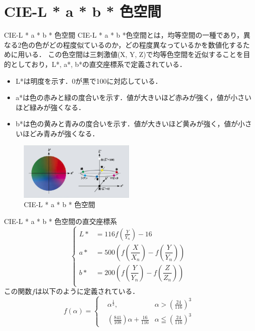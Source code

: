 \documentclass[8pt, jfont=ipaexm, t]{beamer} %
\begin{document}
\section{CIE-L * a * b * 色空間}
\begin{frame}{CIE-L * a * b * 色空間}
CIE-L * a * b *色空間とは，均等空間の一種であり，異なる2色の色がどの程度似ているのか，どの程度異なっているかを数値化するために用いる．
この色空間は三刺激値(X, Y,
Z)で均等色空間を近似することを目的としており，L*, a*, b*の直交座標系で定義されている． 
\begin{itemize}
  \item L*は明度を示す．0が黒で100に対応している． 
  \item a*は色の赤みと緑の度合いを示す．値が大きいほど赤みが強く，値が小さいほど緑みが強くなる．
  \item b*は色の黄みと青みの度合いを示す．値が大きいほど黄みが強く，値が小さいほどみ青みが強くなる．
\end{itemize}
\begin{figure}
  \centering
  \includegraphics[width=0.5\textwidth]{./figure/024.png}
  \caption{CIE-L * a * b * 色空間}
  \label{fig:cie-lab}
\end{figure}
\end{frame}
\begin{frame}{CIE-L * a * b * 色空間の直交座標系}
\begin{equation}
\left\{
\begin{aligned}
    L* &= 116f\left(\frac{Y}{Y_n}\right)-16 \\
    a* &= 500\left(f\left(\dfrac{X}{X_n}\right) - f\left(\dfrac{Y}{Y_n}\right)\right) \\
    b* &= 200\left(f\left(\dfrac{Y}{Y_n}\right) - f\left(\dfrac{Z}{Z_n}\right)\right) \\
\end{aligned}
\right.
\end{equation}
この関数\(f\)は以下のように定義されている．
\begin{equation}
f(\alpha) =
\left\{
\begin{aligned}
&\alpha^{\frac{1}{3}}, & \alpha > \left(\frac{24}{116}\right)^3 \\
&(\frac{841}{108})\alpha + \frac{16}{116} &\alpha \leqq \left(\frac{24}{116}\right)^3
\end{aligned}
\right.
\end{equation}
\end{frame}
\end{document}
